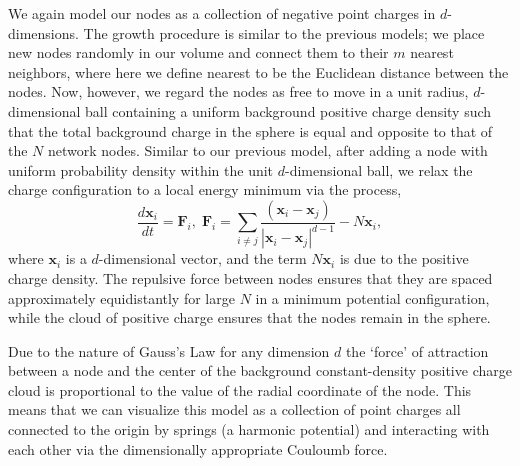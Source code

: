 \documentclass[aps,pre,manuscript,superscriptaddress,amsmath,amssymb,nofootinbib]{revtex4-1}
\begin{document}
We again model our nodes as a collection of negative point charges in $d$-dimensions.
The growth procedure is similar to the previous models; we place new nodes randomly in our volume and connect them to their $m$ nearest neighbors, where here we define nearest to be the Euclidean distance between the nodes.
Now, however, we regard the nodes as free to move in a unit radius, $d$-dimensional ball containing a uniform background positive charge density such that the total background charge in the sphere is equal and opposite to that of the $N$ network nodes.
Similar to our previous model, after adding a node with uniform probability density within the unit $d$-dimensional ball, we relax the charge configuration to a local energy minimum via the process,
\begin{equation}
\frac{d\textbf{x}_i}{dt} = \textbf{F}_i,\;
\textbf{F}_i = \sum_{i \neq j} \frac{(\textbf{x}_i - \textbf{x}_j)}{|\textbf{x}_i-\textbf{x}_j|^{d-1}} - N\textbf{x}_i,
\end{equation}
where $\textbf{x}_i$ is a $d$-dimensional vector, and the term $N\textbf{x}_i$ is due to the positive charge density.
The repulsive force between nodes ensures that they are spaced approximately equidistantly for large $N$ in a minimum potential configuration, while the cloud of positive charge ensures that the nodes remain in the sphere.

Due to the nature of Gauss's Law for any dimension $d$ the `force' of attraction between a node and the center of the background constant-density positive charge cloud is proportional to the value of the radial coordinate of the node.
This means that we can visualize this model as a collection of point charges all connected to the origin by springs (a harmonic potential) and interacting with each other via the dimensionally appropriate Couloumb force.  
\end{document}
